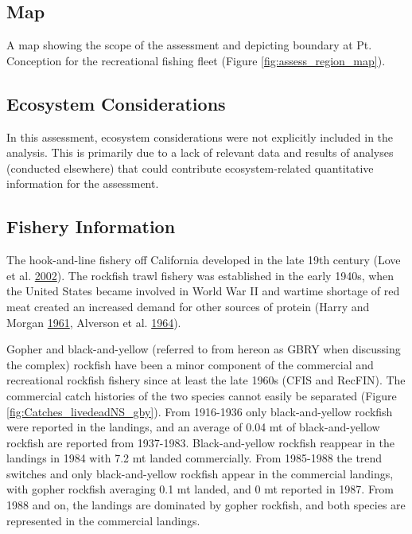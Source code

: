 \documentclass[12pt,]{article}
\begin{document}
\subsection{Map}\label{map}

A map showing the scope of the assessment and depicting boundary at Pt.
Conception for the recreational fishing fleet (Figure
\ref{fig:assess_region_map}).

\subsection{Ecosystem Considerations}\label{ecosystem-considerations-1}

In this assessment, ecosystem considerations were not explicitly
included in the analysis. This is primarily due to a lack of relevant
data and results of analyses (conducted elsewhere) that could contribute
ecosystem-related quantitative information for the assessment.

\subsection{Fishery Information}\label{fishery-information}

The hook-and-line fishery off California developed in the late 19th
century (Love et al. \protect\hyperlink{ref-Love2002}{2002}). The
rockfish trawl fishery was established in the early 1940s, when the
United States became involved in World War II and wartime shortage of
red meat created an increased demand for other sources of protein (Harry
and Morgan \protect\hyperlink{ref-Harry1961}{1961}, Alverson et al.
\protect\hyperlink{ref-Alverson1964}{1964}).

Gopher and black-and-yellow (referred to from hereon as GBRY when
discussing the complex) rockfish have been a minor component of the
commercial and recreational rockfish fishery since at least the late
1960s (CFIS and RecFIN). The commercial catch histories of the two
species cannot easily be separated (Figure
\ref{fig:Catches_livedeadNS_gby}). From 1916-1936 only black-and-yellow
rockfish were reported in the landings, and an average of 0.04 mt of
black-and-yellow rockfish are reported from 1937-1983. Black-and-yellow
rockfish reappear in the landings in 1984 with 7.2 mt landed
commercially. From 1985-1988 the trend switches and only
black-and-yellow rockfish appear in the commercial landings, with gopher
rockfish averaging 0.1 mt landed, and 0 mt reported in 1987. From 1988
and on, the landings are dominated by gopher rockfish, and both species
are represented in the commercial landings.
\end{document}
